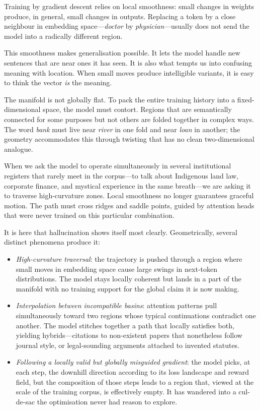 \documentclass[12pt,a4paper]{article}
\begin{document}
Training by gradient descent relies on local smoothness: small changes in weights produce, in general, small changes in outputs. Replacing a token by a close neighbour in embedding space---\emph{doctor} by \emph{physician}---usually does not send the model into a radically different region.

This smoothness makes generalisation possible. It lets the model handle new sentences that are near ones it has seen. It is also what tempts us into confusing meaning with location. When small moves produce intelligible variants, it is easy to think the vector \emph{is} the meaning.

The manifold is not globally flat. To pack the entire training history into a fixed-dimensional space, the model must contort. Regions that are semantically connected for some purposes but not others are folded together in complex ways. The word \emph{bank} must live near \emph{river} in one fold and near \emph{loan} in another; the geometry accommodates this through twisting that has no clean two-dimensional analogue.

When we ask the model to operate simultaneously in several institutional registers that rarely meet in the corpus---to talk about Indigenous land law, corporate finance, and mystical experience in the same breath---we are asking it to traverse high-curvature zones. Local smoothness no longer guarantees graceful motion. The path must cross ridges and saddle points, guided by attention heads that were never trained on this particular combination.

It is here that hallucination shows itself most clearly. Geometrically, several distinct phenomena produce it:

\begin{itemize}
  \item \emph{High-curvature traversal}: the trajectory is pushed through a region where small moves in embedding space cause large swings in next-token distributions. The model stays locally coherent but lands in a part of the manifold with no training support for the global claim it is now making.
  \item \emph{Interpolation between incompatible basins}: attention patterns pull simultaneously toward two regions whose typical continuations contradict one another. The model stitches together a path that locally satisfies both, yielding hybrids---citations to non-existent papers that nonetheless follow journal style, or legal-sounding arguments attached to invented statutes.
  \item \emph{Following a locally valid but globally misguided gradient}: the model picks, at each step, the downhill direction according to its loss landscape and reward field, but the composition of those steps leads to a region that, viewed at the scale of the training corpus, is effectively empty. It has wandered into a cul-de-sac the optimisation never had reason to explore.
\end{itemize}
\end{document}
